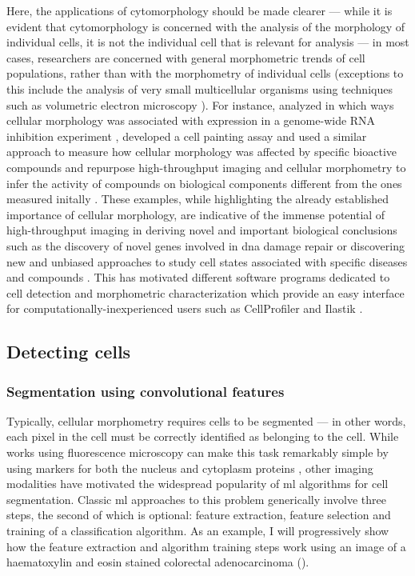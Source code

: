 Here, the applications of cytomorphology should be made clearer --- while it is evident that cytomorphology is concerned with the analysis of the morphology of individual cells, it is not the individual cell that is relevant for analysis --- in most cases, researchers are concerned with general morphometric trends of cell populations, rather than with the morphometry of individual cells (exceptions to this include the analysis of very small multicellular organisms using techniques such as volumetric electron microscopy \cite{Vergara2021-nx,Witvliet2021-gv}). For instance,  analyzed in which ways cellular morphology was associated with expression in a genome-wide RNA inhibition experiment \cite{Fuchs2010-pk},  developed a cell painting assay and used a similar approach to measure how cellular morphology was affected by specific bioactive compounds \cite{Gustafsdottir2013-ul} and  repurpose high-throughput imaging and cellular morphometry to infer the activity of compounds on biological components different from the ones measured initally \cite{Simm2018-nh}. These examples, while highlighting the already established importance of cellular morphology, are indicative of the immense potential of high-throughput imaging in deriving novel and important biological conclusions such as the discovery of novel genes involved in \ac{dna} damage repair \cite{Fuchs2010-pk} or discovering new and unbiased approaches to study cell states associated with specific diseases and compounds \cite{Gustafsdottir2013-ul}. This has motivated different software programs dedicated to cell detection and morphometric characterization which provide an easy interface for computationally-inexperienced users such as CellProfiler \cite{Carpenter2006-hy} and Ilastik \cite{Sommer2011-ds}.

\subsection{Detecting cells}

\subsubsection{Segmentation using convolutional features}

Typically, cellular morphometry requires cells to be segmented --- in other words, each pixel in the cell must be correctly identified as belonging to the cell. While works using fluorescence microscopy can make this task remarkably simple by using markers for both the nucleus and cytoplasm proteins \cite{Fuchs2010-pk,Gustafsdottir2013-ul}, other imaging modalities have motivated the widespread popularity of \ac{ml} algorithms for cell segmentation. Classic \ac{ml} approaches to this problem generically involve three steps, the second of which is optional: feature extraction, feature selection and training of a classification algorithm. As an example, I will progressively show how the feature extraction and algorithm training steps work using an image of a haematoxylin and eosin stained colorectal adenocarcinoma \cite{Graham2019-em} ().

